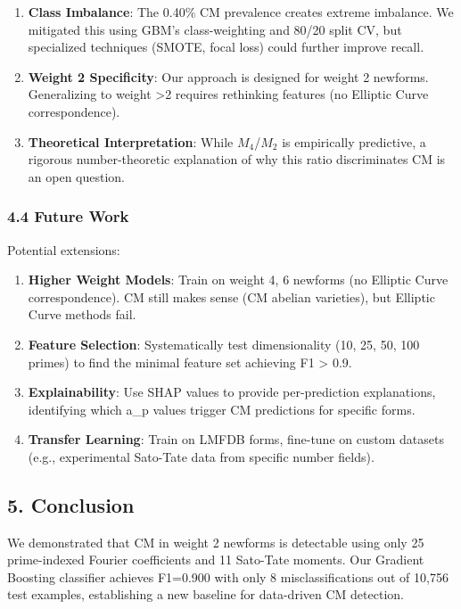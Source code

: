 \documentclass[
]{article}
\begin{document}
\begin{enumerate}
\def\labelenumi{\arabic{enumi}.}
\item
  \textbf{Class Imbalance}: The 0.40\% CM prevalence creates extreme
  imbalance. We mitigated this using GBM's class-weighting and 80/20
  split CV, but specialized techniques (SMOTE, focal loss) could further
  improve recall.
\item
  \textbf{Weight 2 Specificity}: Our approach is designed for weight 2
  newforms. Generalizing to weight \textgreater2 requires rethinking
  features (no Elliptic Curve correspondence).
\item
  \textbf{Theoretical Interpretation}: While $M_4$/$M_2$ is empirically
  predictive, a rigorous number-theoretic explanation of why this ratio
  discriminates CM is an open question.
\end{enumerate}

\hypertarget{future-work}{%
\subsubsection{4.4 Future Work}\label{future-work}}

Potential extensions:

\begin{enumerate}
\def\labelenumi{\arabic{enumi}.}
\item
  \textbf{Higher Weight Models}: Train on weight 4, 6 newforms (no
  Elliptic Curve correspondence). CM still makes sense (CM abelian
  varieties), but Elliptic Curve methods fail.
\item
  \textbf{Feature Selection}: Systematically test dimensionality (10,
  25, 50, 100 primes) to find the minimal feature set achieving F1
  \textgreater{} 0.9.
\item
  \textbf{Explainability}: Use SHAP values to provide per-prediction
  explanations, identifying which a\_p values trigger CM predictions for
  specific forms.
\item
  \textbf{Transfer Learning}: Train on LMFDB forms, fine-tune on custom
  datasets (e.g., experimental Sato-Tate data from specific number
  fields).
\end{enumerate}

\hypertarget{conclusion}{%
\subsection{5. Conclusion}\label{conclusion}}

We demonstrated that CM in weight 2 newforms is detectable using only 25
prime-indexed Fourier coefficients and 11 Sato-Tate moments. Our
Gradient Boosting classifier achieves F1=0.900 with only 8
misclassifications out of 10,756 test examples, establishing a new
baseline for data-driven CM detection.
\end{document}
